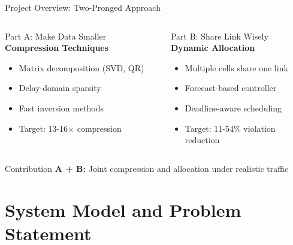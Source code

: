 \documentclass[aspectratio=169]{beamer}
\begin{document}
\begin{frame}{Project Overview: Two-Pronged Approach}
\begin{columns}
\begin{block}{Part A: Make Data Smaller}
\textbf{Compression Techniques}
\begin{itemize}
    \item Matrix decomposition (SVD, QR)
    \item Delay-domain sparsity
    \item Fast inversion methods
    \item Target: 13-16× compression
\end{itemize}
\end{block}

\begin{block}{Part B: Share Link Wisely}
\textbf{Dynamic Allocation}
\begin{itemize}
    \item Multiple cells share one link
    \item Forecast-based controller
    \item Deadline-aware scheduling
    \item Target: 11-54\% violation reduction
\end{itemize}
\end{block}
\end{columns}

\vspace{0.5cm}
\begin{block}{Contribution}
\textbf{A + B:} Joint compression and allocation under realistic traffic
\end{block}
\end{frame}

\section{System Model and Problem Statement}
\end{document}
